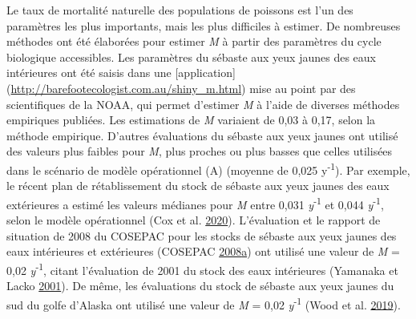 \documentclass[french,11pt]{book}
\begin{document}
Le taux de mortalité naturelle des populations de poissons est l'un des paramètres les plus importants, mais les plus difficiles à estimer. De nombreuses méthodes ont été élaborées pour estimer \emph{M} à partir des paramètres du cycle biologique accessibles. Les paramètres du sébaste aux yeux jaunes des eaux intérieures ont été saisis dans une {[}application{]} (\url{http://barefootecologist.com.au/shiny_m.html}) mise au point par des scientifiques de la NOAA, qui permet d'estimer \emph{M} à l'aide de diverses méthodes empiriques publiées. Les estimations de \emph{M} variaient de 0,03 à 0,17, selon la méthode empirique. D'autres évaluations du sébaste aux yeux jaunes ont utilisé des valeurs plus faibles pour \emph{M}, plus proches ou plus basses que celles utilisées dans le scénario de modèle opérationnel (A) (moyenne de 0,025 y\textsuperscript{-1}). Par exemple, le récent plan de rétablissement du stock de sébaste aux yeux jaunes des eaux extérieures a estimé les valeurs médianes pour \emph{M} entre 0,031 \emph{y}\textsuperscript{-1} et 0,044 \emph{y}\textsuperscript{-1}, selon le modèle opérationnel (Cox et al. \protect\hyperlink{ref-cox2020}{2020}). L'évaluation et le rapport de situation de 2008 du COSEPAC pour les stocks de sébaste aux yeux jaunes des eaux intérieures et extérieures (COSEPAC \protect\hyperlink{ref-cosewic2008}{2008}\protect\hyperlink{ref-cosewic2008}{a}) ont utilisé une valeur de \emph{M} = 0,02 \emph{y}\textsuperscript{-1}, citant l'évaluation de 2001 du stock des eaux intérieures (Yamanaka et Lacko \protect\hyperlink{ref-yamanaka2001}{2001}). De même, les évaluations du stock de sébaste aux yeux jaunes du sud du golfe d'Alaska ont utilisé une valeur de \emph{M} = 0,02 \emph{y}\textsuperscript{-1} (Wood et al. \protect\hyperlink{ref-wood2019}{2019}).
\end{document}
